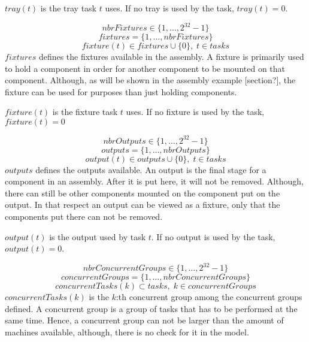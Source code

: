  $tray(t)$ is the tray task $t$ uses. If no tray is used by the task, $tray(t) = 0$.
 
 
 \begin{equation}\label{eq:5}
 nbrFixtures \in \{1 , \ldots , 2^{32}-1\}
 \end{equation}
 \begin{equation}\label{eq:15}
 fixtures = \{1 , \ldots , nbrFixtures\}
 \end{equation}
 \begin{equation}\label{eq:24}
 fixture(t) \in fixtures \cup \{0\}, \; t \in tasks
 \end{equation}
 $fixtures$ defines the fixtures available in the assembly. A fixture is primarily used to hold a component in order for another component to be mounted on that component. Although, as will be shown in the assembly example [section?], the fixture can be used for purposes than just holding components.
 
 $fixture(t)$ is the fixture task $t$ uses. If no fixture is used by the task, $fixture(t) = 0$
 
 \begin{equation}\label{eq:7}
 nbrOutputs \in \{1 , \ldots , 2^{32}-1\}
 \end{equation}
 \begin{equation}\label{eq:16}
 outputs = \{1 , \ldots , nbrOutputs\}
 \end{equation}
 \begin{equation}\label{eq:23}
 output(t) \in outputs \cup \{0\}, \; t \in tasks
 \end{equation}
 $outputs$ defines the outputs available. An output is the final stage for a component in an assembly. After it is put here, it will not be removed. Although, there can still be other components mounted on the component put on the output. In that respect an output can be viewed as a fixture, only that the components put there can not be removed.
 
 $output(t)$ is the output used by task $t$. If no output is used by the task, $output(t) = 0$.
 
 
 \begin{equation}\label{eq:8}
 nbrConcurrentGroups \in \{1 , \ldots , 2^{32}-1\}
 \end{equation}
 \begin{equation}\label{eq:17}
 concurrentGroups = \{1 , \ldots , nbrConcurrentGroups\}
 \end{equation}
 \begin{equation}\label{eq:30}
 concurrentTasks(k) \subset tasks, \; k \in concurrentGroups
 \end{equation}
 $concurrentTasks(k)$ is the $k$:th concurrent group among the concurrent groups defined. A concurrent group is a group of tasks that has to be performed at the same time. Hence, a concurrent group can not be larger than the amount of machines available, although, there is no check for it in the model. 
 
